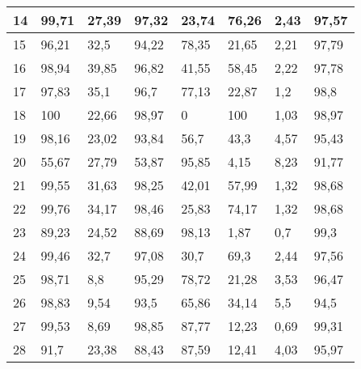 \begin{longtable}[c]{|l|l|l|l|l|l|l|l|}
14              & 99,71        & 27,39        & 97,32       & 23,74         & 76,26         & 2,43          & 97,57         \\ \hline
15              & 96,21        & 32,5         & 94,22       & 78,35         & 21,65         & 2,21          & 97,79         \\ \hline
16              & 98,94        & 39,85        & 96,82       & 41,55         & 58,45         & 2,22          & 97,78         \\ \hline
17              & 97,83        & 35,1         & 96,7        & 77,13         & 22,87         & 1,2           & 98,8          \\ \hline
18              & 100          & 22,66        & 98,97       & 0             & 100           & 1,03          & 98,97         \\ \hline
19              & 98,16        & 23,02        & 93,84       & 56,7          & 43,3          & 4,57          & 95,43         \\ \hline
20              & 55,67        & 27,79        & 53,87       & 95,85         & 4,15          & 8,23          & 91,77         \\ \hline
21              & 99,55        & 31,63        & 98,25       & 42,01         & 57,99         & 1,32          & 98,68         \\ \hline
22              & 99,76        & 34,17        & 98,46       & 25,83         & 74,17         & 1,32          & 98,68         \\ \hline
23              & 89,23        & 24,52        & 88,69       & 98,13         & 1,87          & 0,7           & 99,3          \\ \hline
24              & 99,46        & 32,7         & 97,08       & 30,7          & 69,3          & 2,44          & 97,56         \\ \hline
25              & 98,71        & 8,8          & 95,29       & 78,72         & 21,28         & 3,53          & 96,47         \\ \hline
26              & 98,83        & 9,54         & 93,5        & 65,86         & 34,14         & 5,5           & 94,5          \\ \hline
27              & 99,53        & 8,69         & 98,85       & 87,77         & 12,23         & 0,69          & 99,31         \\ \hline
28              & 91,7         & 23,38        & 88,43       & 87,59         & 12,41         & 4,03          & 95,97         \\ \hline

\end{longtable}
